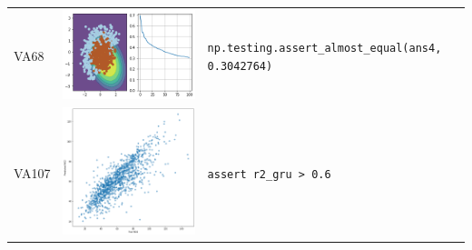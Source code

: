 \begin{longtable}{@{} m{} m{} m{} @{}}
  VA68 &
  \includegraphics[width=\linewidth]{va68.png} &
  \lstinline[]$np.testing.assert_almost_equal(ans4, 0.3042764)$\\

  VA107 &
  \includegraphics[width=\linewidth]{va107.png} &
  \lstinline[]$assert r2_gru > 0.6$\\

\end{longtable}\label{tab:va-model-perf}

